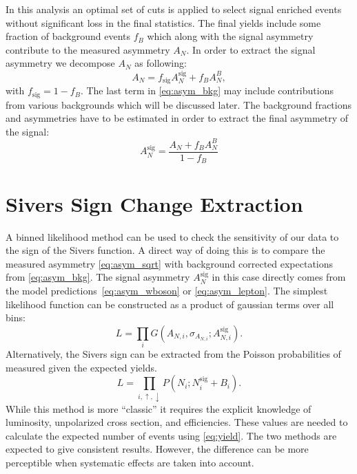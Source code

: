 \documentclass[12pt]{article}
\begin{document}
In this analysis an optimal set of cuts is applied to select signal enriched
events without significant loss in the final statistics. The final yields
include some fraction of background events $f_B$ which along with the signal
asymmetry contribute to the measured asymmetry $A_N$. In order to extract the
signal asymmetry we decompose $A_N$ as following:
%
\begin{equation}
A_N = f_\text{sig} A^\text{sig}_N + f_B A^B_N,
\label{eq:asym_bkg}
\end{equation}
%
with $f_\text{sig} = 1 - f_B$. The last term in \eqref{eq:asym_bkg} may include
contributions from various backgrounds which will be discussed later. The
background fractions and asymmetries have to be estimated in order to extract
the final asymmetry of the signal:
%
\begin{equation}
A^\text{sig}_N = \frac{A_N + f_B A^B_N}{1 - f_B}
\label{eq_bkg_corr}
\end{equation}



\section{Sivers Sign Change Extraction}

A binned likelihood method can be used to check the sensitivity of our data to
the sign of the Sivers function. A direct way of doing this is to compare the
measured asymmetry \eqref{eq:asym_sqrt} with background corrected expectations
from \eqref{eq:asym_bkg}. The signal asymmetry $A^\text{sig}_N$ in this case
directly comes from the model predictions~\eqref{eq:asym_wboson} or
\eqref{eq:asym_lepton}. The simplest likelihood function can be constructed as a
product of gaussian terms over all bins:
%
\begin{equation}
L = \prod\limits_i G(A_{N,i}, \sigma_{A_{N,i}}; A^\text{sig}_{N,i}).
\end{equation}
%
Alternatively, the Sivers sign can be extracted from the Poisson probabilities
of measured given the expected yields.
%
\begin{equation}
L = \prod\limits_{i,\uparrow,\downarrow} P(N_i; N^\text{sig}_{i} + B_i).
\end{equation}
%
While this method is more ``classic'' it requires the explicit knowledge of
luminosity, unpolarized cross section, and efficiencies. These values are
needed to calculate the expected number of events using \eqref{eq:yield}. The
two methods are expected to give consistent results. However, the difference
can be more perceptible when systematic effects are taken into account.
\end{document}

